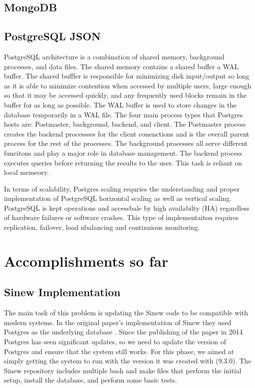 \documentclass[sigconf]{acmart}
\begin{document}
    \subsection{MongoDB}


        \subsection{PostgreSQL JSON}
     PostgreSQL architecture \cite{PostgresMedium} is a combination of shared memory, background processes, and data files. The shared memory contains a shared buffer a WAL buffer. The shared bufffer is responsible for minimizing disk input/output so long as it is able to minimize contention when accessed by multiple users, large enough so that it may be accessed quickly, and any frequently used blocks remain in the buffer for as long as possible. The WAL buffer is used to store changes in the database temporarily in a WAL file. The four main process types that Postgres hosts are: Postmaster, background, backend, and client. The Postmaster process creates the backend processses for the client conenctions and is the overall parent process for the rest of the processes. The background processes all serve different funcitons and play a major role in database management. The backend process executes queries before returning the results to the user. This task is reliant on local memeory. 

     In terms of scalability, Postgres scaling\cite{Postgres-scalable} requries the understanding and proper implementation of PostgreSQL horizontal scaling as well as vertical scaling. PostgreSQL is kept operations and accessbale by high availabilty (HA) regardless of hardware failures or software crashes. This type of implementaiton requires replication, failover, load nbalancing and continuious monitoring. 

\section{Accomplishments so far}
    \subsection{Sinew Implementation}
    The main task of this problem is updating the Sinew code to be compatible with modern systems. In the original paper's implementation of Sinew they used Postgres as the underlying database \cite{Tahara_Diamond_Abadi_2014}. Since the publishing of the paper in 2014 Postgres has seen significant updates, so we need to update the version of Postgres and ensure that the system still works. For this phase, we aimed at simply getting the system to run with the version it was created with (9.3.0). The Sinew repository includes multiple bash and make files that perform the initial setup, install the database, and perform some basic tests.
\end{document}
